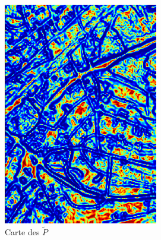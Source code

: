 \documentclass{article}
\begin{document}
\begin{figure}[h!]
\begin{minipage}{0.24\textwidth}
        \includegraphics[width=\linewidth]{result_image/Image_2/2.png}
        \caption*{\small Carte des $\tilde{P}$}
    \end{minipage}\hfill
    \begin{minipage}{0.24\textwidth}
        \centering

\end{minipage}
\end{figure}
\end{document}
